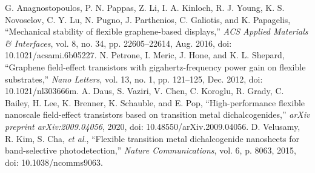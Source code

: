 \documentclass[conference]{IEEEtran}
\begin{document}
\begin{thebibliography}{00}
 G. Anagnostopoulos, P. N. Pappas, Z. Li, I. A. Kinloch, R. J. Young, K. S. Novoselov, C. Y. Lu, N. Pugno, J. Parthenios, C. Galiotis, and K. Papagelis, ``Mechanical stability of flexible graphene-based displays,'' \textit{ACS Applied Materials \& Interfaces}, vol. 8, no. 34, pp. 22605–22614, Aug. 2016, doi: 10.1021/acsami.6b05227.
 N. Petrone, I. Meric, J. Hone, and K. L. Shepard, ``Graphene field-effect transistors with gigahertz-frequency power gain on flexible substrates,'' \textit{Nano Letters}, vol. 13, no. 1, pp. 121–125, Dec. 2012, doi: 10.1021/nl303666m.
 A. Daus, S. Vaziri, V. Chen, C. Koroglu, R. Grady, C. Bailey, H. Lee, K. Brenner, K. Schauble, and E. Pop, ``High-performance flexible nanoscale field-effect transistors based on transition metal dichalcogenides,'' \textit{arXiv preprint arXiv:2009.04056}, 2020, doi: 10.48550/arXiv.2009.04056.
 D. Velusamy, R. Kim, S. Cha, \textit{et al}., ``Flexible transition metal dichalcogenide nanosheets for band-selective photodetection,'' \textit{Nature Communications}, vol. 6, p. 8063, 2015, doi: 10.1038/ncomms9063.
\end{thebibliography}
\end{document}
